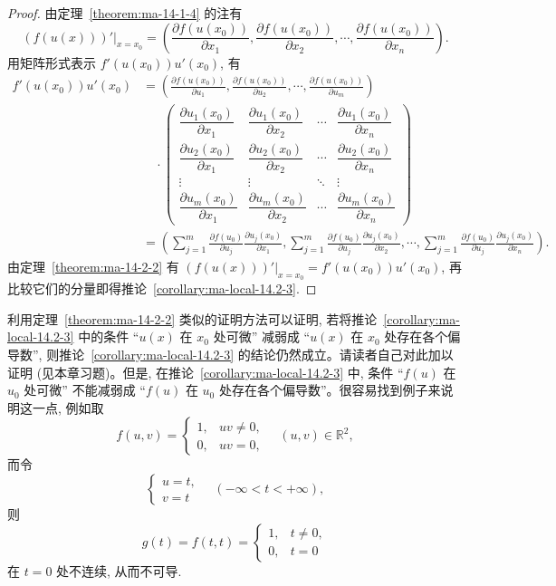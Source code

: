 \begin{proof}
由定理~\ref{theorem:ma-14-1-4} 的注有
\[
  \left.(f(u(x)))'\right|_{x=x_0}
  =\left(
  \frac{\partial f(u(x_0))}{\partial x_1},
  \frac{\partial f(u(x_0))}{\partial x_2},
  \cdots,
  \frac{\partial f(u(x_0))}{\partial x_n}
  \right).
\]
用矩阵形式表示 $f'(u(x_0))u'(x_0)$, 有
\[
\begin{aligned}
  f'(u(x_0))u'(x_0)
  &=
  \left(
  \frac{\partial f(u(x_0))}{\partial u_1},
  \frac{\partial f(u(x_0))}{\partial u_2},
  \cdots,
  \frac{\partial f(u(x_0))}{\partial u_m}
  \right)\\
  &\quad\cdot
  \begin{pmatrix}
    \dfrac{\partial u_1(x_0)}{\partial x_1}&\dfrac{\partial u_1(x_0)}{\partial x_2}&\cdots&\dfrac{\partial u_1(x_0)}{\partial x_n}\\
    \dfrac{\partial u_2(x_0)}{\partial x_1}&\dfrac{\partial u_2(x_0)}{\partial x_2}&\cdots&\dfrac{\partial u_2(x_0)}{\partial x_n}\\
    \vdots&\vdots&\ddots&\vdots\\
    \dfrac{\partial u_m(x_0)}{\partial x_1}&\dfrac{\partial u_m(x_0)}{\partial x_2}&\cdots&\dfrac{\partial u_m(x_0)}{\partial x_n}
  \end{pmatrix}\\
  &=
  \left(
  \sum_{j=1}^m\frac{\partial f(u_0)}{\partial u_j}\frac{\partial u_j(x_0)}{\partial x_1},
  \sum_{j=1}^m\frac{\partial f(u_0)}{\partial u_j}\frac{\partial u_j(x_0)}{\partial x_2},
  \cdots,
  \sum_{j=1}^m\frac{\partial f(u_0)}{\partial u_j}\frac{\partial u_j(x_0)}{\partial x_n}
  \right).
\end{aligned}
\]
由定理~\ref{theorem:ma-14-2-2} 有 $\left.(f(u(x)))'\right|_{x=x_0}=f'(u(x_0))u'(x_0)$, 再比较它们的分量即得推论~\ref{corollary:ma-local-14.2-3}.
\end{proof}


\begin{remark}\label{remark:ma-14-source-46}
利用定理~\ref{theorem:ma-14-2-2} 类似的证明方法可以证明, 若将推论~\ref{corollary:ma-local-14.2-3} 中的条件 ``$u(x)$ 在 $x_0$ 处可微'' 减弱成 ``$u(x)$ 在 $x_0$ 处存在各个偏导数'', 则推论~\ref{corollary:ma-local-14.2-3} 的结论仍然成立。请读者自己对此加以证明 (见本章习题)。但是, 在推论~\ref{corollary:ma-local-14.2-3} 中, 条件 ``$f(u)$ 在 $u_0$ 处可微'' 不能减弱成 ``$f(u)$ 在 $u_0$ 处存在各个偏导数''。很容易找到例子来说明这一点, 例如取
\[
  f(u,v)=
  \begin{cases}
    1, &uv\ne0,\\
    0, &uv=0,
  \end{cases}
  \quad (u,v)\in\mathbb R^2,
\]
而令
\[
  \begin{cases}
    u=t,\\
    v=t
  \end{cases}
  \quad(-\infty<t<+\infty),
\]
则
\[
  g(t)=f(t,t)=
  \begin{cases}
    1, &t\ne0,\\
    0, &t=0
  \end{cases}
\]
在 $t=0$ 处不连续, 从而不可导.
\end{remark}

